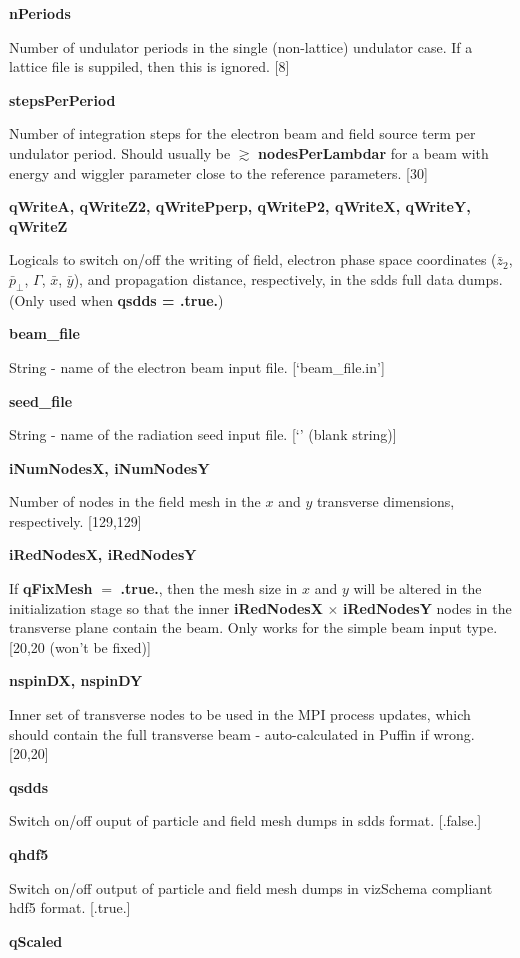 \documentclass[12pt]{article}%
\begin{document}
{\bf nPeriods}

Number of undulator periods in the single (non-lattice) undulator case. If a lattice file is suppiled, then this is ignored. [8]

{\bf stepsPerPeriod}

Number of integration steps for the electron beam and field source term per undulator period. Should usually be $\gtrsim$ {\bf nodesPerLambdar} for a beam with energy and wiggler parameter close to the reference parameters. [30]

{\bf qWriteA, qWriteZ2, qWritePperp, qWriteP2, qWriteX, qWriteY, qWriteZ}

Logicals to switch on/off the writing of field, electron phase space coordinates ($\bar{z}_2$, $\bar{p}_\bot$, $\Gamma$, $\bar{x}$, $\bar{y}$), and propagation distance, respectively, in the sdds full data dumps. (Only used when {\bf qsdds = .true.})

{\bf beam\_file}

String - name of the electron beam input file. [`beam\_file.in']

{\bf seed\_file}

String - name of the radiation seed input file. [`' (blank string)]

{\bf iNumNodesX, iNumNodesY}

Number of nodes in the field mesh in the $x$ and $y$ transverse dimensions, respectively. [129,129]

{\bf iRedNodesX, iRedNodesY}

If {\bf qFixMesh} $=$ {\bf .true.}, then the mesh size in $x$ and $y$ will be altered in the initialization stage so that the inner {\bf iRedNodesX} $\times$ {\bf iRedNodesY} nodes in the transverse plane contain the beam. Only works for the simple beam input type. [20,20 (won't be fixed)]



{\bf nspinDX, nspinDY}

Inner set of transverse nodes to be used in the MPI process updates, which should contain the full transverse beam - auto-calculated in Puffin if wrong. [20,20]

{\bf qsdds}

Switch on/off ouput of particle and field mesh dumps in sdds format. [.false.]

{\bf qhdf5}

Switch on/off output of particle and field mesh dumps in vizSchema compliant hdf5 format. [.true.]

{\bf qScaled}
\end{document}
